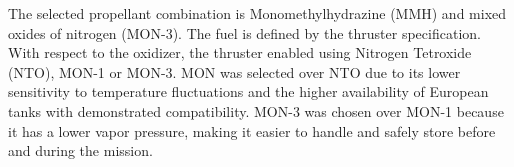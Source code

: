 \documentclass[conference]{IEEEtran}
\begin{document}
\begin{table} [H]
\centering
\caption{Bipropellant Main Thruster Trade-off}
\label{tab:thruster-tradeoff}
\end{table}
The selected propellant combination is Monomethylhydrazine (MMH) and mixed oxides of nitrogen (MON-3). The fuel is defined by the thruster specification. With respect to the oxidizer, the thruster enabled using Nitrogen Tetroxide (NTO), MON-1 or MON-3. MON was selected over NTO due to its lower sensitivity to temperature fluctuations and the higher availability of European tanks with demonstrated compatibility. MON-3 was chosen over MON-1 because it has a lower vapor pressure, making it easier to handle and safely store before and during the mission. %
\end{document}
